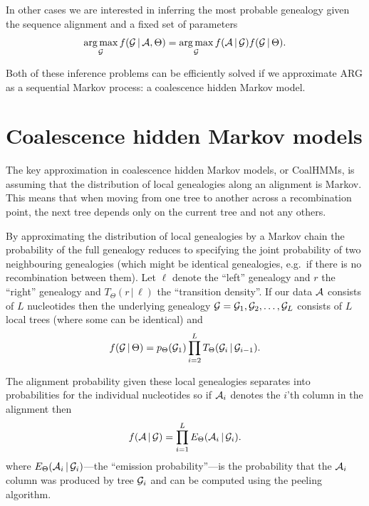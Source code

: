 In other cases we are interested in inferring the most probable genealogy given the sequence alignment and a fixed set of parameters
\begin{displaymath}
  \operatorname*{arg\,max}_{\mathcal{G}} f(\mathcal{G}\,|\,\mathcal{A},\Theta) = 
  \operatorname*{arg\,max}_{\mathcal{G}} f(\mathcal{A}\,|\,\mathcal{G}) f(\mathcal{G}\,|\,\Theta)
  .
\end{displaymath}

Both of these inference problems can be efficiently solved if we approximate ARG as a sequential Markov process: a coalescence hidden Markov model.

\section{Coalescence hidden Markov models}

The key approximation in coalescence hidden Markov models, or CoalHMMs, is assuming that the distribution of local genealogies along an alignment is Markov. This means that when moving from one tree to another across a recombination point, the next tree depends only on the current tree and not any others. 

By approximating the distribution of local genealogies by a Markov chain the probability of the full genealogy reduces to specifying the joint probability of two neighbouring genealogies (which might be identical genealogies, e.g.\ if there is no recombination between them). Let $\ell$ denote the ``left'' genealogy and $r$ the ``right'' genealogy and $T_\Theta(r \,|\, \ell)$ the ``transition density''. If our data $\mathcal{A}$ consists of $L$ nucleotides then the underlying genealogy $\mathcal{G}=\mathcal{G}_1,\mathcal{G}_2,\ldots,\mathcal{G}_L$  consists of $L$ local trees (where some can be identical) and
\[
    f(\mathcal{G}\,|\,\Theta) = p_\Theta(\mathcal{G}_1) \prod_{i=2}^L T_\Theta(\mathcal{G}_i\,|\,\mathcal{G}_{i-1}) .
\]

The alignment probability given these local genealogies separates into probabilities for the individual nucleotides so if $\mathcal{A}_i$ denotes the $i$'th column in the alignment then
\[
    f(\mathcal{A}\,|\,\mathcal{G}) = \prod_{i=1}^L E_\Theta(\mathcal{A}_i\,|\,\mathcal{G}_i) .
\]
where $E_\Theta(\mathcal{A}_i\,|\,\mathcal{G}_i)$---the ``emission probability''---is the probability that the $\mathcal{A}_i$ column was produced by tree $\mathcal{G}_i$ and can be computed using the peeling algorithm.

